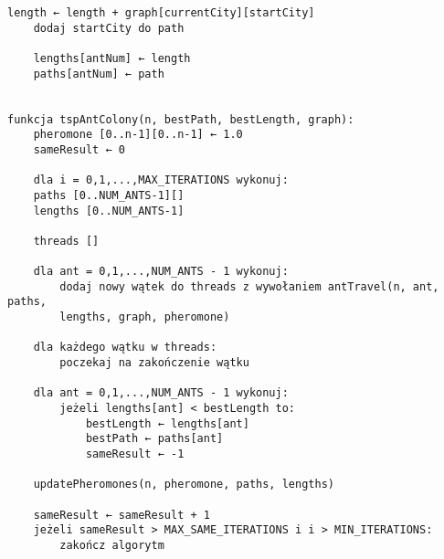 \documentclass{article}
\begin{document}
\begin{Verbatim}[commandchars=\\\{\}]
    length ← length + graph[currentCity][startCity]
    dodaj startCity do path
    
    lengths[antNum] ← length
    paths[antNum] ← path
    
    
funkcja tspAntColony(n, bestPath, bestLength, graph):
    pheromone [0..n-1][0..n-1] ← 1.0
    sameResult ← 0
    
    dla i = 0,1,...,MAX_ITERATIONS wykonuj:
    paths [0..NUM_ANTS-1][]
    lengths [0..NUM_ANTS-1]
    
    threads []
    
    dla ant = 0,1,...,NUM_ANTS - 1 wykonuj:
        dodaj nowy wątek do threads z wywołaniem antTravel(n, ant, paths,
        lengths, graph, pheromone)
    
    dla każdego wątku w threads:
        poczekaj na zakończenie wątku
    
    dla ant = 0,1,...,NUM_ANTS - 1 wykonuj:
        jeżeli lengths[ant] < bestLength to:
            bestLength ← lengths[ant]
            bestPath ← paths[ant]
            sameResult ← -1
    
    updatePheromones(n, pheromone, paths, lengths)
    
    sameResult ← sameResult + 1
    jeżeli sameResult > MAX_SAME_ITERATIONS i i > MIN_ITERATIONS:
        zakończ algorytm
    
	
\end{Verbatim}
\end{document}
